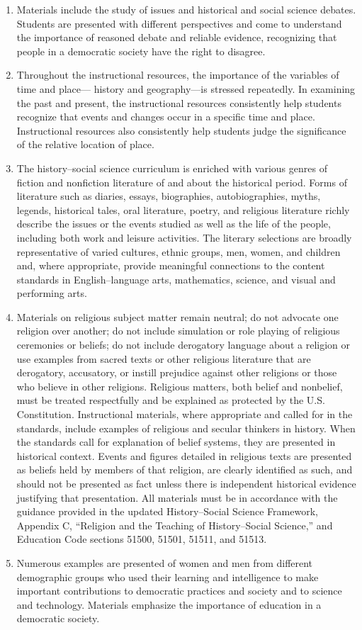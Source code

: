 \begin{enumerate}
\item 
Materials include the study of issues and historical and social science debates. Students are presented with different perspectives and come to understand the importance of reasoned debate and reliable evidence, recognizing that people in a democratic society have the right to disagree.
\item 
Throughout the instructional resources, the importance of the variables of time and place— history and geography—is stressed repeatedly. In examining the past and present, the instructional resources consistently help students recognize that events and changes occur in a specific time and place. Instructional resources also consistently help students judge the significance of the relative location of place.
\item 
The history–social science curriculum is enriched with various genres of fiction and nonfiction literature of and about the historical period. Forms of literature such as diaries, essays, biographies, autobiographies, myths, legends, historical tales, oral literature, poetry, and religious literature richly describe the issues or the events studied as well as the life of the people, including both work and leisure activities. The literary selections are broadly representative of varied cultures, ethnic groups, men, women, and children and, where appropriate, provide meaningful connections to the content standards in English–language arts, mathematics, science, and visual and performing arts.
\item 
Materials on religious subject matter remain neutral; do not advocate one religion over another; do not include simulation or role playing of religious ceremonies or beliefs; do not include derogatory language about a religion or use examples from sacred texts or other religious literature that are derogatory, accusatory, or instill prejudice against other religions or those who believe in other religions. Religious matters, both belief and nonbelief, must be treated respectfully and be explained as protected by the U.S. Constitution. Instructional materials, where appropriate and called for in the standards, include examples of religious and secular thinkers in history. When the standards call for explanation of belief systems, they are presented in historical context. Events and figures detailed in religious texts are presented as beliefs held by members of that religion, are clearly identified as such, and should not be presented as fact unless there is independent historical evidence justifying that presentation. All materials must be in accordance with the guidance provided in the updated History–Social Science Framework, Appendix C, “Religion and the Teaching of History–Social Science,” and Education Code sections 51500, 51501, 51511, and 51513.
\item 
Numerous examples are presented of women and men from different demographic groups who used their learning and intelligence to make important contributions to democratic practices and society and to science and technology. Materials emphasize the importance of education in a democratic society.
\end{enumerate}
